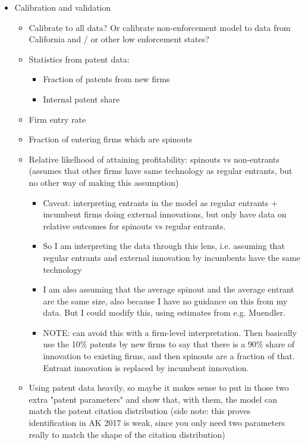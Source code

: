 \documentclass[11pt,english]{article}
\theoremstyle{remark}
\begin{document}
\begin{itemize}
\begin{itemize}
		\item 
	\end{itemize}
	\item Calibration and validation
	\begin{itemize}
		\item Calibrate to all data? Or calibrate non-enforcement model to data from California and / or other low enforcement states? 
		\item Statistics from patent data:
		\begin{itemize}
			\item Fraction of patents from new firms
			\item Internal patent share
		\end{itemize}
		\item Firm entry rate
		\item Fraction of entering firms which are spinouts
		\item Relative likelhood of attaining profitability: spinouts vs non-entrants (assumes that other firms have same technology as regular entrants, but no other way of making this assumption)
		\begin{itemize}
			\item Caveat: interpreting entrants in the model as regular entrants + incumbent firms doing external innovations, but only have data on relative outcomes for spinouts vs regular entrants. 
			\item So I am interpreting the data through this lens, i.e. assuming that regular entrants and external innovation by incumbents have the same technology
			\item I am also assuming that the average spinout and the average entrant are the same size, also because I have no guidance on this from my data. But I could modify this, using estimates from e.g. Muendler. 
			\item NOTE: can avoid this with a firm-level interpretation. Then basically use the 10\% patents by new firms to say that there is a 90\% share of innovation to existing firms, and then spinouts are a fraction of that. Entrant innovation is replaced by incumbent innovation. 
		\end{itemize}
		\item Using patent data heavily, so maybe it makes sense to put in those two extra "patent parameters" and show that, with them, the model can match the patent citation distribution (side note: this proves identification in AK 2017 is weak, since you only need two parameters really to match the shape of the citation distribution)

\end{itemize}
\end{itemize}
\end{document}
